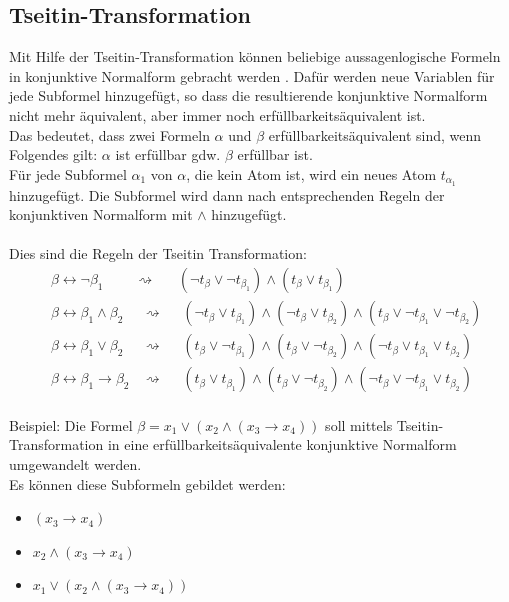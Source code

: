 \documentclass[a4,abstract=on]{scrartcl}
\begin{document}
\subsection{Tseitin-Transformation}
Mit Hilfe der Tseitin-Transformation können beliebige aussagenlogische Formeln in konjunktive Normalform gebracht werden \cite [vgl.][]{tseitin}. Dafür werden neue Variablen für jede Subformel hinzugefügt, so dass die resultierende konjunktive Normalform nicht mehr äquivalent, aber immer noch erfüllbarkeitsäquivalent ist. \\
Das bedeutet, dass zwei Formeln $\alpha$ und $\beta$ erfüllbarkeitsäquivalent sind, wenn Folgendes gilt:
$\alpha$ ist erfüllbar gdw. $\beta$ erfüllbar ist.
\ \\
Für jede Subformel $\alpha_1$ von $\alpha$, die kein Atom ist, wird ein neues Atom $t_{\alpha_1}$ hinzugefügt. Die Subformel wird dann nach entsprechenden Regeln der konjunktiven Normalform mit $\wedge$ hinzugefügt.\\
\ \\
Dies sind die Regeln der Tseitin Transformation:
\begin{align*}
&\beta \leftrightarrow\neg \beta_1 {~~~~~~~~~~}\rightsquigarrow{~~~~~~~} (\neg t_\beta \vee \neg t_{\beta_1 }) \wedge (t_\beta \vee t_{\beta_1})\\
&\beta \leftrightarrow \beta_1 \wedge \beta_2 {~~~~~~}\rightsquigarrow{~~~~~~} (\neg t_\beta \vee  t_{\beta_1 }) \wedge (\neg t_\beta \vee t_{\beta_2}) \wedge (t_\beta \vee \neg t_{\beta_1} \vee \neg t_{\beta_2})\\
&\beta \leftrightarrow \beta_1 \vee \beta_2 {~~~~~~}\rightsquigarrow{~~~~~~} (t_\beta \vee  \neg t_{\beta_1 }) \wedge (t_\beta \vee \neg t_{\beta_2}) \wedge (\neg t_\beta \vee t_{\beta_1} \vee t_{\beta_2})\\
&\beta \leftrightarrow \beta_1 \rightarrow \beta_2 {~~~~}\rightsquigarrow{~~~~~~} (t_\beta \vee  t_{\beta_1 }) \wedge (t_\beta \vee \neg t_{\beta_2}) \wedge (\neg t_\beta \vee \neg t_{\beta_1} \vee t_{\beta_2})
\end{align*}
\ \\
Beispiel: Die Formel $\beta = x_1 \vee (x_2 \wedge (x_3 \rightarrow x_4))$ soll mittels Tseitin-Transformation in eine erfüllbarkeitsäquivalente konjunktive Normalform umgewandelt werden.\\
Es können diese Subformeln gebildet werden:\\
\begin{itemize}
\item $(x_3 \rightarrow x_4)$
\item $x_2 \wedge (x_3 \rightarrow x_4)$
\item $x_1 \vee (x_2 \wedge (x_3 \rightarrow x_4))$
\end{itemize}
\end{document}

